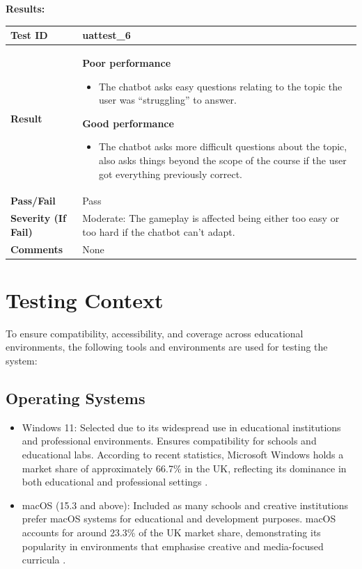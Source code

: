 \documentclass[11pt, a4paper]{article}
\begin{document}
\newpage

\noindent \textbf{Results:}

\begin{center}
\begin{tabularx}{\linewidth}{|>{\raggedright\arraybackslash}m{4cm}|X|}
    \hline
    \textbf{Test ID} & uattest\_6 \\
    \hline
    \textbf{Result} &
    \textbf{Poor performance}
    \begin{itemize}
        \item The chatbot asks easy questions relating to the topic the user was “struggling” to answer.
    \end{itemize}
    \textbf{Good performance}
    \begin{itemize}
        \item The chatbot asks more difficult questions about the topic, also asks things beyond the scope of the course if the user got everything previously correct.
    \end{itemize}
    \\
    \hline
    \textbf{Pass/Fail} & Pass \\
    \hline
    \textbf{Severity (If Fail)} & Moderate: The gameplay is affected being either too easy or too hard if the chatbot can't adapt. \\
    \hline
    \textbf{Comments} & None \\
    \hline
\end{tabularx}
\end{center}


\newpage

\section{Testing Context}

\noindent To ensure compatibility, accessibility, and coverage across educational environments, the following tools and environments are used for testing the system:

\subsection{Operating Systems}

\begin{itemize}
    \item Windows 11: Selected due to its widespread use in educational institutions and professional environments. Ensures compatibility for schools and educational labs. According to recent statistics, Microsoft Windows holds a market share of approximately 66.7\% in the UK, reflecting its dominance in both educational and professional settings \cite{statista}.
    \item macOS (15.3 and above): Included as many schools and creative institutions prefer macOS systems for educational and development purposes. macOS accounts for around 23.3\% of the UK market share, demonstrating its popularity in environments that emphasise creative and media-focused curricula \cite{statista}.
\end{itemize}
\end{document}
